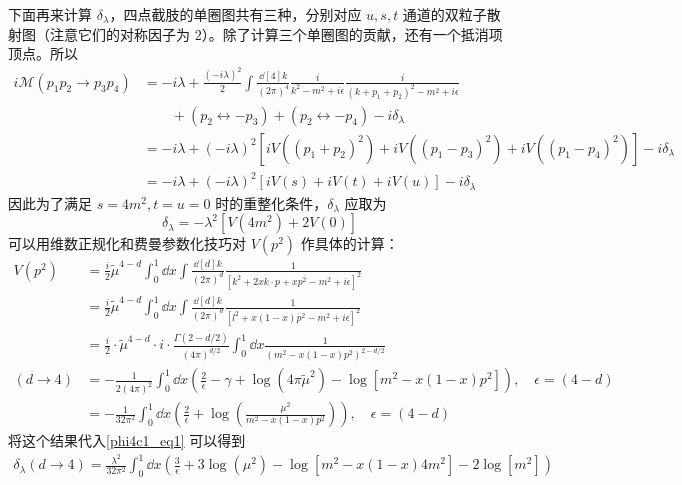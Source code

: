 下面再来计算 $\delta_\lambda$，四点截肢的单圈图共有三种，分别对应 $u,s,t$ 通道的双粒子散射图（注意它们的对称因子为 $2$）。除了计算三个单圈图的贡献，还有一个抵消项顶点。所以
\begin{equation}\label{phi4c1_eq3}
\begin{aligned}
i\mathcal{M}(p_1p_2\rightarrow p_3p_4) &= -i\lambda + \frac{(-i\lambda)^2}{2} \int \frac{\dd[4]{k}}{(2\pi)^4} \frac{i}{k^2-m^2+i\epsilon} \frac{i}{(k+p_1+p_2)^2-m^2+i\epsilon}\\
&\quad\quad + (p_2\leftrightarrow -p_3)+(p_2\leftrightarrow -p_4)-i\delta_\lambda\\
&=-i\lambda + (-i\lambda)^2 [iV((p_1+p_2)^2)+iV((p_1-p_3)^2)+iV((p_1-p_4)^2)]-i\delta_\lambda\\
&=-i\lambda + (-i\lambda)^2 [iV(s)+iV(t)+iV(u)]-i\delta_\lambda
\end{aligned}
\end{equation}
因此为了满足 $s=4m^2,t=u=0$ 时的重整化条件，$\delta_\lambda$ 应取为
\begin{equation}\label{phi4c1_eq1}
\delta_\lambda = -\lambda^2[V(4m^2)+2V(0)]
\end{equation}
可以用维数正规化和费曼参数化技巧对 $V(p^2)$ 作具体的计算：
\begin{equation}
\begin{aligned}
V(p^2)&=\frac{i}{2}\tilde{\mu}^{4-d}\int_0^1 \dd x \int \frac{\dd[d]{k}}{(2\pi)^d} \frac{1}{[k^2+2xk\cdot p+xp^2-m^2+i\epsilon]^2}\\
&=\frac{i}{2}\tilde{\mu}^{4-d}\int_0^1 \dd x \int \frac{\dd[d]{k}}{(2\pi)^d} \frac{1}{[l^2+x(1-x)p^2-m^2+i\epsilon]^2}\\
&=\frac{i}{2} \cdot \tilde{\mu}^{4-d}\cdot i\cdot\frac{\Gamma(2-d/2)}{(4\pi)^{d/2}}\int_0^1 \dd x\frac{1}{(m^2-x(1-x)p^2)^{2-d/2}}\\
(d\rightarrow 4)
&=-\frac{1}{2(4\pi)^2}\int_0^1 \dd x 
\left(
    \frac{2}{\epsilon}-\gamma+\log(4\pi\tilde{\mu}^2)-\log[m^2-x(1-x)p^2]
    \right) ,\quad \epsilon =(4-d)\\
&=-\frac{1}{32\pi^2}\int_0^1 \dd x 
\left(
    \frac{2}{\epsilon}+\log\left(\frac{\mu^2}{m^2-x(1-x)p^2}\right)
    \right) ,\quad \epsilon =(4-d)
\end{aligned}
\end{equation}
将这个结果代入\autoref{phi4c1_eq1} 可以得到
\begin{equation}
\begin{aligned}
\delta_\lambda (d\rightarrow 4)=\frac{\lambda^2}{32\pi^2}\int_0^1\dd x \left(\frac{3}{\epsilon}
 +3\log(\mu^2) - \log[m^2-x(1-x)4m^2]
-2\log[m^2]
\right)
\end{aligned}
\end{equation}

